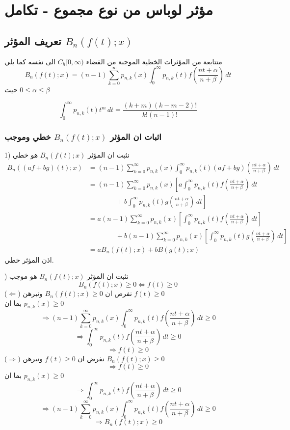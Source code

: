 \chapter{مؤثر لوباس من نوع مجموع - تكامل}

\section{تعريف المؤثر $B_n(f(t); x)$}
متتابعة من المؤثرات الخطية الموجبة من الفضاء $C_h[0, \infty)$ الى نفسه كما يلي
\[
B_n(f(t); x) = (n-1)\sum_{k=0}^{\infty} p_{n, k}(x) \int_{0}^{\infty} p_{n, k}(t) f\left(\frac{nt + \alpha}{n + \beta}\right) \, dt
\]
حيث $0 \leq \alpha\leq \beta$

\begin{note}
	\[
	\int_{0}^{\infty} p_{n, k}(t) t^m \, dt = \frac{(k+m)(k-m-2)!}{k!(n-1)!}
	\]
\end{note}

\subsection*{اثبات ان المؤثر $B_n(f(t); x)$ خطي وموجب}
1) نثبت ان المؤثر $B_n(f(t); x)$ هو خطي
\begin{align*}
	B_n((af+bg)(t); x) &= (n-1)\sum_{k=0}^{\infty} p_{n, k}(x) \int_{0}^{\infty} p_{n, k}(t) (af+bg)\left(\frac{nt + \alpha}{n + \beta}\right) \, dt\\
	&= (n-1)\sum_{k=0}^{\infty} p_{n, k}(x)  \left[a\int_{0}^{\infty} p_{n, k}(t) f\left(\frac{nt + \alpha}{n + \beta}\right) \, dt\right.\\
	&\qquad\qquad  +\left. b\int_{0}^{\infty} p_{n, k}(t) g\left(\frac{nt + \alpha}{n + \beta}\right) \, dt\right]\\
	&= a(n-1)\sum_{k=0}^{\infty} p_{n, k}(x)  \left[\int_{0}^{\infty} p_{n, k}(t) f\left(\frac{nt + \alpha}{n + \beta}\right) \, dt\right]\\
	&\qquad\qquad  + b(n-1)\sum_{k=0}^{\infty} p_{n, k}(x)  \left[\int_{0}^{\infty} p_{n, k}(t) g\left(\frac{nt + \alpha}{n + \beta}\right) \, dt\right]\\
	& = a B_n(f(t) ; x) + b B(g(t); x)
\end{align*}
اذن المؤثر خطي.

) نثبت ان المؤثر $B_n(f(t); x)$ هو موجب
\[
B_n(f(t); x) \geq 0 \iff f(t) \geq 0
\]
($\Leftarrow$) نفرض ان $B_n(f(t); x) \geq 0$ ونبرهن $f(t) \geq 0$\\
بما ان $p_{n, k}(x) \geq 0 $ 
\[
\Rightarrow (n-1)\sum_{k=0}^{\infty} p_{n, k}(x) \int_{0}^{\infty} p_{n, k}(t) f\left(\frac{nt + \alpha}{n + \beta}\right) \, dt \geq 0 
\] 
\[
\Rightarrow \int_{0}^{\infty} p_{n, k}(t) f\left(\frac{nt + \alpha}{n + \beta}\right) \, dt \geq 0
\]
\[
\Rightarrow f(t) \geq 0
\]
($\Rightarrow$) نفرض ان $f(t) \geq 0$ ونبرهن $B_n(f(t); x) \geq 0$
\[
\Rightarrow f(t) \geq 0
\]
بما ان $p_{n, k}(x) \geq 0 $ 
\[
\Rightarrow \int_{0}^{\infty} p_{n, k}(t) f\left(\frac{nt + \alpha}{n + \beta}\right) \, dt \geq 0
\]
\[
\Rightarrow (n-1)\sum_{k=0}^{\infty} p_{n, k}(x) \int_{0}^{\infty} p_{n, k}(t) f\left(\frac{nt + \alpha}{n + \beta}\right) \, dt \geq 0 
\] 
\[
\Rightarrow B_n(f(t); x) \geq 0
\]

